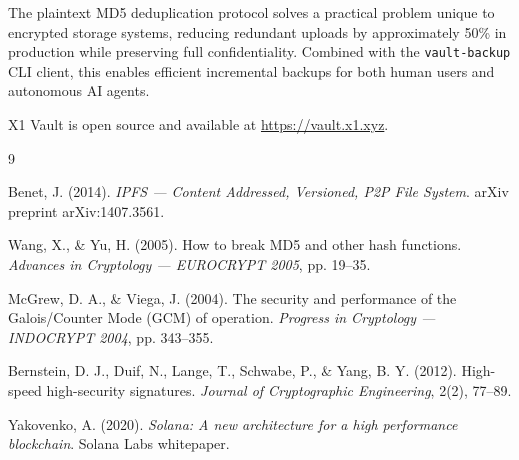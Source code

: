 \documentclass[11pt,a4paper]{article}
\begin{document}
The plaintext MD5 deduplication protocol solves a practical problem unique to encrypted storage systems, reducing redundant uploads by approximately 50\% in production while preserving full confidentiality. Combined with the \texttt{vault-backup} CLI client, this enables efficient incremental backups for both human users and autonomous AI agents.

X1 Vault is open source and available at \url{https://vault.x1.xyz}.

\begin{thebibliography}{9}

Benet, J. (2014).
\textit{IPFS --- Content Addressed, Versioned, P2P File System}.
arXiv preprint arXiv:1407.3561.

Wang, X., \& Yu, H. (2005).
How to break MD5 and other hash functions.
\textit{Advances in Cryptology --- EUROCRYPT 2005}, pp. 19--35.

McGrew, D. A., \& Viega, J. (2004).
The security and performance of the Galois/Counter Mode (GCM) of operation.
\textit{Progress in Cryptology --- INDOCRYPT 2004}, pp. 343--355.

Bernstein, D. J., Duif, N., Lange, T., Schwabe, P., \& Yang, B. Y. (2012).
High-speed high-security signatures.
\textit{Journal of Cryptographic Engineering}, 2(2), 77--89.

Yakovenko, A. (2020).
\textit{Solana: A new architecture for a high performance blockchain}.
Solana Labs whitepaper.

\end{thebibliography}
\end{document}

